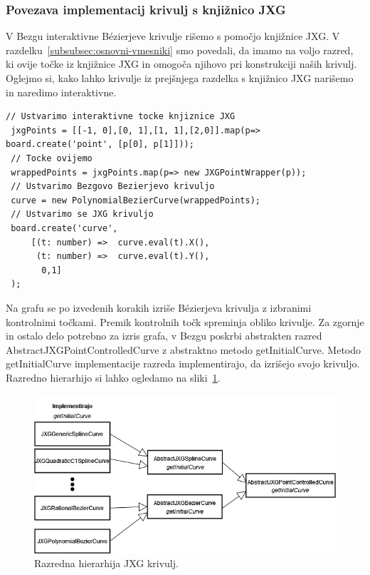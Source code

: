 \documentclass[isrm2, tisk]{fmfdelo}
\begin{document}
    \subsubsection{Povezava implementacij krivulj s knjižnico JXG}
    V Bezgu interaktivne Bézierjeve krivulje rišemo s pomočjo knjižnice JXG\@.
    V razdelku~\ref{subsubsec:osnovni-vmesniki} smo povedali, da imamo na voljo razred, ki ovije točke iz knjižnice JXG in omogoča njihovo pri konstrukciji naših krivulj.
    Oglejmo si, kako lahko krivulje iz prejšnjega razdelka s knjižnico JXG narišemo in naredimo interaktivne.
    \begin{lstlisting}[label={lst:ghdfg}]
 // Ustvarimo interaktivne tocke knjiznice JXG
 jxgPoints = [[-1, 0],[0, 1],[1, 1],[2,0]].map(p=> board.create('point', [p[0], p[1]]));
 // Tocke ovijemo
 wrappedPoints = jxgPoints.map(p=> new JXGPointWrapper(p));
 // Ustvarimo Bezgovo Bezierjevo krivuljo
 curve = new PolynomialBezierCurve(wrappedPoints);
 // Ustvarimo se JXG krivuljo
 board.create('curve',
     [(t: number) =>  curve.eval(t).X(),
      (t: number) =>  curve.eval(t).Y(),
       0,1]
 );
    \end{lstlisting}
    Na grafu se po izvedenih korakih izriše Bézierjeva krivulja z izbranimi kontrolnimi točkami.
    Premik kontrolnih točk spreminja obliko krivulje.
    Za zgornje in ostalo delo potrebno za izris grafa, v Bezgu poskrbi abstrakten razred AbstractJXGPointControlledCurve z abstraktno metodo getInitialCurve.
    Metodo getInitialCurve implementacije razreda implementirajo, da izrišejo svojo krivuljo.
    Razredno hierarhijo si lahko ogledamo na sliki~\ref{fig:hiearhija-jxg-krivulj}.
    \begin{figure}[h!]
        \centering
        \includegraphics[width = \textwidth]{drawio/jxgcurveshierarhija.drawio}
        \caption{Razredna hierarhija JXG krivulj.}
        \label{fig:hiearhija-jxg-krivulj}
    \end{figure}
\end{document}
